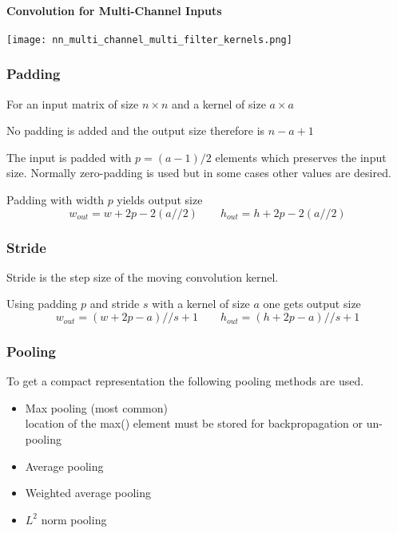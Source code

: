\paragraph{Convolution for Multi-Channel Inputs}
\begin{center}
    \texttt{[image: nn\_multi\_channel\_multi\_filter\_kernels.png]}
\end{center}

\subsubsection{Padding}

For an input matrix of size $n\times n$ and a kernel of size $a\times a$

\newpar{}

No padding is added and the output size therefore is $n-a+1$

\newpar{}

The input is padded with $p=(a-1)/2$ elements which preserves the input size. Normally zero-padding is used but in some cases other values are desired.

\newpar{}

Padding with width $p$ yields output size
\begin{equation*}
    w_{out}=  w+2p-2(a//2) \qquad
    h_{out}=  h+2p-2(a//2)
\end{equation*}

\subsubsection{Stride}
Stride is the step size of the moving convolution kernel.

Using padding $p$ and stride $s$ with a kernel of size $a$ one gets output size
\begin{equation*}
    w_{out}= (w+2p-a)//s + 1 \qquad
    h_{out}= (h+2p-a)//s + 1
\end{equation*}


\subsubsection{Pooling}
To get a compact representation the following pooling methods are used.
\begin{itemize}
    \item Max pooling (most common)
          \\ location of the max() element must be stored for backpropagation or un-pooling
    \item Average pooling
    \item Weighted average pooling
    \item $L^2$ norm pooling
\end{itemize}

